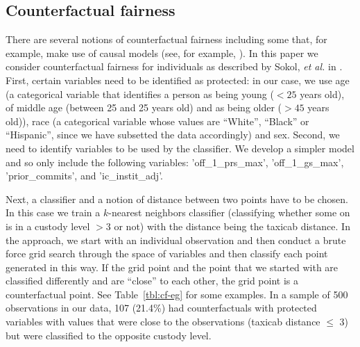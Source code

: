 \documentclass{amsproc}
\numberwithin{equation}{section}
\theoremstyle{plain}
\theoremstyle{remark}
\begin{document}
\subsection{Counterfactual fairness}  There are several notions of counterfactual fairness including some that, for example, make use of causal models (see, for example, \cite{kusner}).  In this paper we consider counterfactual fairness for individuals as described by Sokol, \textit{et al.} in \cite{sokol}.  First, certain variables need to be identified as protected: in our case, we use age (a categorical variable that identifies a person as being young ($<25$ years old), of middle age (between 25 and 25 years old) and as being older ($> 45$ years old)), race (a categorical variable whose values are ``White'', ``Black'' or ``Hispanic'', since we have subsetted the data accordingly) and sex.  Second, we need to identify variables to be used by the classifier.  We develop a simpler model and so only include the following variables:  'off\_1\_prs\_max', 'off\_1\_gs\_max', 'prior\_commits', and 'ic\_instit\_adj'.


Next, a classifier and a notion of distance between two points have to be chosen.  In this case we train a $k$-nearest neighbors classifier (classifying whether some on is in a custody level $>3$ or not) with the distance being the taxicab distance.  In the approach, we start with an individual observation and then conduct a brute force grid search through the space of variables and then classify each point generated in this way.  If the grid point and the point that we started with are classified differently and are ``close'' to each other, the grid point is a counterfactual point.  See Table~\ref{tbl:cf-eg} for some examples.  In a sample of 500 observations in our data, 107 (21.4\%) had counterfactuals with protected variables with values that were close to the observations (taxicab distance $\leq$ 3) but were classified to the opposite custody level.
\end{document}
